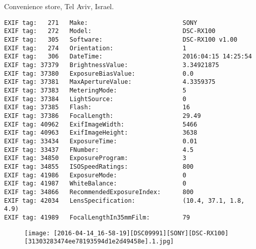 \section{\protect{}}
\noindent Convenience store, Tel Aviv, Israel.
\noindent
\begin{lstlisting}
EXIF tag:   271   Make:                          SONY
EXIF tag:   272   Model:                         DSC-RX100
EXIF tag:   305   Software:                      DSC-RX100 v1.00
EXIF tag:   274   Orientation:                   1
EXIF tag:   306   DateTime:                      2016:04:15 14:25:54
EXIF tag: 37379   BrightnessValue:               3.34921875
EXIF tag: 37380   ExposureBiasValue:             0.0
EXIF tag: 37381   MaxApertureValue:              4.3359375
EXIF tag: 37383   MeteringMode:                  5
EXIF tag: 37384   LightSource:                   0
EXIF tag: 37385   Flash:                         16
EXIF tag: 37386   FocalLength:                   29.49
EXIF tag: 40962   ExifImageWidth:                5466
EXIF tag: 40963   ExifImageHeight:               3638
EXIF tag: 33434   ExposureTime:                  0.01
EXIF tag: 33437   FNumber:                       4.5
EXIF tag: 34850   ExposureProgram:               3
EXIF tag: 34855   ISOSpeedRatings:               800
EXIF tag: 41986   ExposureMode:                  0
EXIF tag: 41987   WhiteBalance:                  0
EXIF tag: 34866   RecommendedExposureIndex:      800
EXIF tag: 42034   LensSpecification:             (10.4, 37.1, 1.8, 4.9)
EXIF tag: 41989   FocalLengthIn35mmFilm:         79

\end{lstlisting}
\clearpage
\begin{figure}
\raggedleft
\texttt{[image: [2016-04-14\_16-58-19][DSC09991][SONY][DSC-RX100][31303283474ee78193594d1e2d49458e].1.jpg]}
\end{figure}


\clearpage
